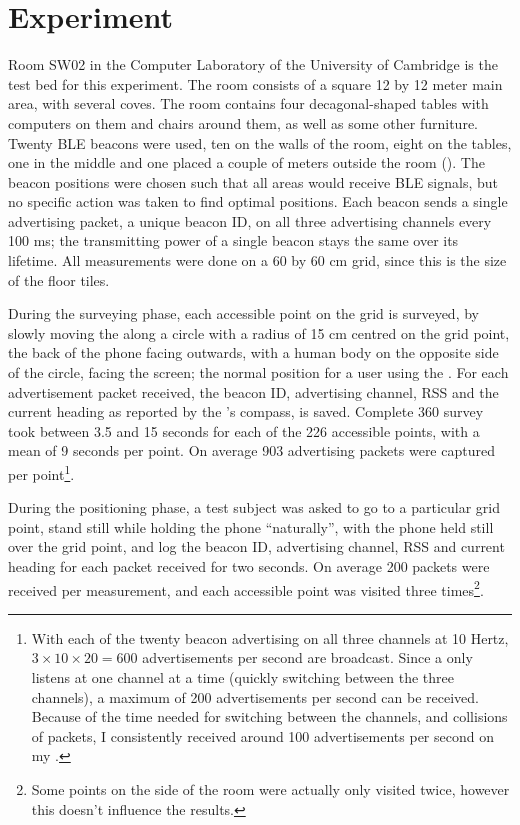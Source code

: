 \section{Experiment}
\label{sec:architecture-experiment}
Room SW02 in the Computer Laboratory of the University of Cambridge is the test bed for this experiment.
The room consists of a square 12 by 12 meter main area, with several coves.
The room contains four decagonal-shaped tables with computers on them and chairs around them, as well as some other furniture.
Twenty BLE beacons were used, ten on the walls of the room, eight on the tables, one in the middle and one placed a couple of meters outside the room ().
The beacon positions were chosen such that all areas would receive BLE signals, but no specific action was taken to find optimal positions.
Each beacon sends a single advertising packet, a unique beacon ID, on all three advertising channels every 100 ms; the transmitting power of a single beacon stays the same over its lifetime.
All measurements were done on a 60 by 60 cm grid, since this is the size of the floor tiles.

During the surveying phase, each accessible point on the grid is surveyed, by slowly moving the \device along a circle with a radius of 15 cm centred on the grid point, the back of the phone facing outwards, with a human body on the opposite side of the circle, facing the screen; the normal position for a user using the \device.
For each advertisement packet received, the beacon ID, advertising channel, RSS and the current heading as reported by the \device's compass, is saved.
Complete 360\textdegree{} survey took between 3.5 and 15 seconds for each of the 226 accessible points, with a mean of 9 seconds per point.
On average 903 advertising packets were captured per point\footnote{With each of the twenty beacon advertising on all three channels at 10 Hertz, $3 \times 10 \times 20 = 600$ advertisements per second are broadcast. Since a \device only listens at one channel at a time (quickly switching between the three channels), a maximum of 200 advertisements per second can be received. Because of the time needed for switching between the channels, and collisions of packets, I consistently received around 100 advertisements per second on my \device.}.

During the positioning phase, a test subject was asked to go to a particular grid point, stand still while holding the phone ``naturally'', with the phone held still over the grid point, and log the beacon ID, advertising channel, RSS and current heading for each packet received for two seconds.
On average 200 packets were received per measurement, and each accessible point was visited three times\footnote{Some points on the side of the room were actually only visited twice, however this doesn't influence the results.}.

